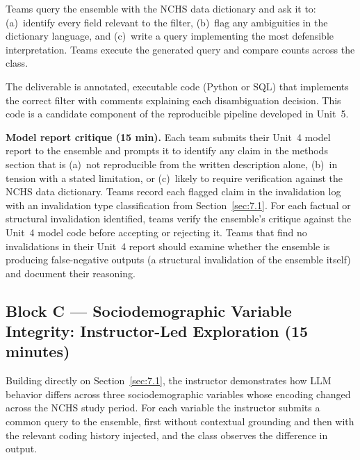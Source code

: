Teams query the ensemble with the NCHS data dictionary and ask it
to: (a)~identify every field relevant to the filter, (b)~flag
any ambiguities in the dictionary language, and (c)~write a query
implementing the most defensible interpretation. Teams execute
the generated query and compare counts across the class.


The deliverable is annotated, executable code (Python or SQL) that
implements the correct filter with comments explaining each
disambiguation decision. This code is a candidate component of
the reproducible pipeline developed in Unit~5.

\textbf{Model report critique (15 min).} Each team submits
their Unit~4 model report to the ensemble and prompts it to
identify any claim in the methods section that is (a)~not
reproducible from the written description alone, (b)~in
tension with a stated limitation, or (c)~likely to require
verification against the NCHS data dictionary. Teams record
each flagged claim in the invalidation log with an invalidation
type classification from Section~\ref{sec:7.1}. For each
factual or structural invalidation identified, teams verify
the ensemble's critique against the Unit~4 model code before
accepting or rejecting it. Teams that find no invalidations
in their Unit~4 report should examine whether the ensemble
is producing false-negative outputs (a structural invalidation
of the ensemble itself) and document their reasoning.

\subsection*{Block C --- Sociodemographic Variable
Integrity: Instructor-Led Exploration (15 minutes)}

Building directly on Section~\ref{sec:7.1}, the
instructor demonstrates how LLM behavior differs across
three sociodemographic variables whose encoding changed
across the NCHS study period. 
For each variable the instructor submits a
common query to the ensemble, first without contextual
grounding and then with the relevant coding history
injected, and the class observes the difference in output.

